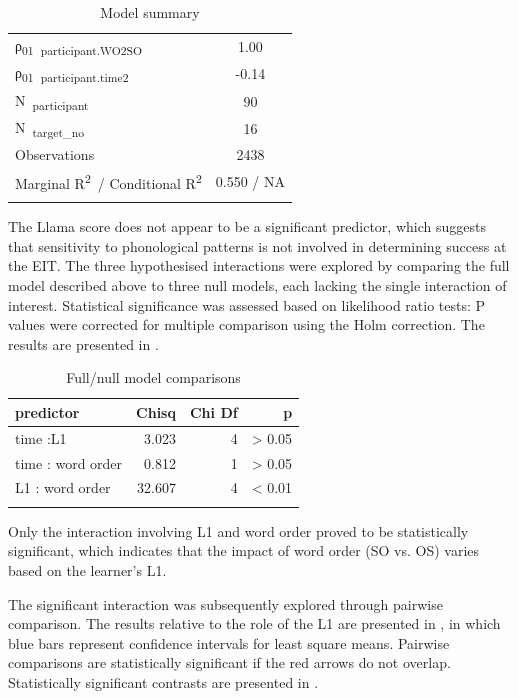 \begin{table}
\begin{tabularx}{\textwidth}{Xrrr}
    ρ\textsubscript{01}~\textsubscript{participant.WO2SO} & \multicolumn{3}{c}{1.00}\\
    ρ\textsubscript{01}~\textsubscript{participant.time2} & \multicolumn{3}{c}{{}-0.14}\\
    N~\textsubscript{participant} & \multicolumn{3}{c}{90}\\
    N~\textsubscript{target\_no} & \multicolumn{3}{c}{16}\\
    \midrule
    Observations & \multicolumn{3}{c}{2438}\\
    Marginal R\textsuperscript{2}~/ Conditional R\textsuperscript{2} & \multicolumn{3}{c}{0.550 / NA}\\
    \lspbottomrule
    \end{tabularx}
    \caption{Model summary}
    \label{tab:04:3}
\end{table}

The Llama score does not appear to be a significant predictor, which suggests that sensitivity to phonological patterns is not involved in determining success at the EIT. The three hypothesised interactions were explored by comparing the full model described above to three null models, each lacking the single interaction of interest. Statistical significance was assessed based on likelihood ratio tests: P values were corrected for multiple comparison using the Holm correction. The results are presented in .

\begin{table}
    \begin{tabularx}{.8\textwidth}{Xrrr}
    \lsptoprule
    predictor & Chisq & Chi Df & p\\
    \midrule
    time :L1 & 3.023 & 4 & > 0.05\\
    time : word order & 0.812 & 1 & > 0.05\\
    L1 : word order & 32.607 & 4 & < 0.01\\
    \lspbottomrule
    \end{tabularx}
    \caption{Full/null model comparisons}
    \label{tab:04:4}
\end{table}

Only the interaction involving L1 and word order proved to be statistically significant, which indicates that the impact of word order (SO vs. OS) varies based on the learner’s L1. 

The significant interaction was subsequently explored through pairwise comparison. The results relative to the role of the L1 are presented in , in which blue bars represent confidence intervals for least square means. Pairwise comparisons are statistically significant if the red arrows do not overlap. Statistically significant contrasts are presented in .

